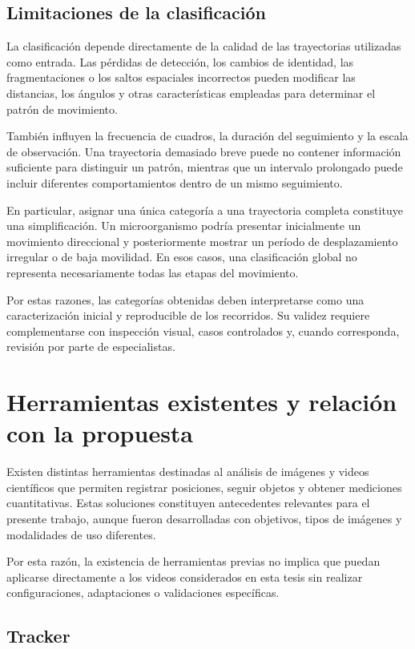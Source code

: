 \subsection{Limitaciones de la clasificación}

La clasificación depende directamente de la calidad de las trayectorias utilizadas como entrada. Las pérdidas de detección, los cambios de identidad, las fragmentaciones o los saltos espaciales incorrectos pueden modificar las distancias, los ángulos y otras características empleadas para determinar el patrón de movimiento.

También influyen la frecuencia de cuadros, la duración del seguimiento y la escala de observación. Una trayectoria demasiado breve puede no contener información suficiente para distinguir un patrón, mientras que un intervalo prolongado puede incluir diferentes comportamientos dentro de un mismo seguimiento.

En particular, asignar una única categoría a una trayectoria completa constituye una simplificación. Un microorganismo podría presentar inicialmente un movimiento direccional y posteriormente mostrar un período de desplazamiento irregular o de baja movilidad. En esos casos, una clasificación global no representa necesariamente todas las etapas del movimiento.

Por estas razones, las categorías obtenidas deben interpretarse como una caracterización inicial y reproducible de los recorridos. Su validez requiere complementarse con inspección visual, casos controlados y, cuando corresponda, revisión por parte de especialistas.

\section{Herramientas existentes y relación con la propuesta}

Existen distintas herramientas destinadas al análisis de imágenes y videos científicos que permiten registrar posiciones, seguir objetos y obtener mediciones cuantitativas. Estas soluciones constituyen antecedentes relevantes para el presente trabajo, aunque fueron desarrolladas con objetivos, tipos de imágenes y modalidades de uso diferentes.

Por esta razón, la existencia de herramientas previas no implica que puedan aplicarse directamente a los videos considerados en esta tesis sin realizar configuraciones, adaptaciones o validaciones específicas.

\subsection{Tracker}

